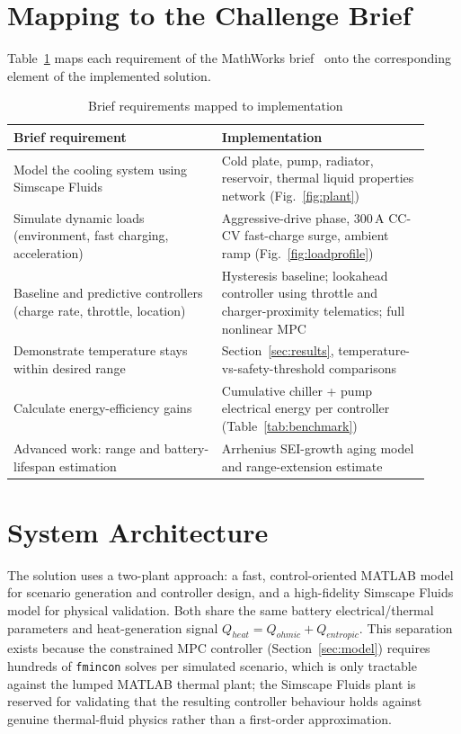 \documentclass[10pt,conference]{IEEEtran}
\begin{document}
\section{Mapping to the Challenge Brief}
\label{sec:brief}

Table~\ref{tab:brief} maps each requirement of the MathWorks brief~\cite{mathworks_hub} onto the corresponding element of the implemented solution.

\begin{table}[t]
\centering
\caption{Brief requirements mapped to implementation}
\label{tab:brief}
\small
\begin{tabular}{@{}p{0.46\linewidth}p{0.46\linewidth}@{}}
\toprule
\textbf{Brief requirement} & \textbf{Implementation} \\
\midrule
Model the cooling system using Simscape Fluids & Cold plate, pump, radiator, reservoir, thermal liquid properties network (Fig.~\ref{fig:plant}) \\
Simulate dynamic loads (environment, fast charging, acceleration) & Aggressive-drive phase, 300\,A CC-CV fast-charge surge, ambient ramp (Fig.~\ref{fig:loadprofile}) \\
Baseline and predictive controllers (charge rate, throttle, location) & Hysteresis baseline; lookahead controller using throttle and charger-proximity telematics; full nonlinear MPC \\
Demonstrate temperature stays within desired range & Section~\ref{sec:results}, temperature-vs-safety-threshold comparisons \\
Calculate energy-efficiency gains & Cumulative chiller + pump electrical energy per controller (Table~\ref{tab:benchmark}) \\
Advanced work: range and battery-lifespan estimation & Arrhenius SEI-growth aging model and range-extension estimate \\
\bottomrule
\end{tabular}
\end{table}

\section{System Architecture}
\label{sec:arch}

The solution uses a two-plant approach: a fast, control-oriented MATLAB model for scenario generation and controller design, and a high-fidelity Simscape Fluids model for physical validation. Both share the same battery electrical/thermal parameters and heat-generation signal $Q_{heat} = Q_{ohmic} + Q_{entropic}$. This separation exists because the constrained MPC controller (Section~\ref{sec:model}) requires hundreds of \texttt{fmincon} solves per simulated scenario, which is only tractable against the lumped MATLAB thermal plant; the Simscape Fluids plant is reserved for validating that the resulting controller behaviour holds against genuine thermal-fluid physics rather than a first-order approximation.
\end{document}
